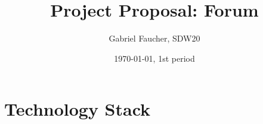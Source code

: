 \documentclass[12pt,a4paper]{article}
\title{Project Proposal: Forum}
\author{Gabriel Faucher, SDW20}
\date{\today, 1st period}
\begin{document}
\maketitle



\section{Technology Stack}





\end{document}
